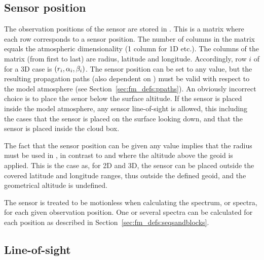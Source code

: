 \subsection{Sensor position}
\label{sec:fm_defs:sensorpos}

The observation positions of the sensor are stored in
. This is a matrix where each row corresponds to
a sensor position. The number of columns in the matrix equals the
atmospheric dimensionality (1 column for 1D etc.). The columns of the
matrix (from first to last) are radius, latitude and longitude.
Accordingly, row $i$ of  for a 3D case is
$(r_{i},\alpha_{i},\beta_{i})$. The sensor position can be set to any
value, but the resulting propagation paths (also dependent on
) must be valid with respect to the model
atmosphere (see Section~\ref{sec:fm_defs:ppaths}). An obviously
incorrect choice is to place the senor below the surface altitude. If
the sensor is placed inside the model atmosphere, any sensor
line-of-sight is allowed, this including the cases that the sensor is
placed on the surface looking down, and that the sensor is placed
inside the cloud box.

The fact that the sensor position can be given any value implies that
the radius must be used in , in contrast to
 and  where the altitude
above the geoid is applied. This is the case as, for 2D and 3D, the
sensor can be placed outside the covered latitude and longitude
ranges, thus outside the defined geoid, and the geometrical altitude is
undefined. 

The sensor is treated to be motionless when calculating the spectrum,
or spectra, for each given observation position. One or several
spectra can be calculated for each position as described in
Section~\ref{sec:fm_defs:seqsandblocks}.


\subsection{Line-of-sight}
\label{sec:fm_defs:los}

